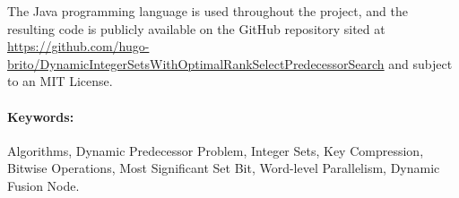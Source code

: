 The Java programming language is used throughout the project, and the resulting code is publicly available on the GitHub repository sited at \url{https://github.com/hugo-brito/DynamicIntegerSetsWithOptimalRankSelectPredecessorSearch} and subject to an MIT License.

\paragraph*{Keywords:} Algorithms, Dynamic Predecessor Problem, Integer Sets, Key Compression, Bitwise Operations, Most Significant Set Bit, Word-level Parallelism, Dynamic Fusion Node.

    
    
    


